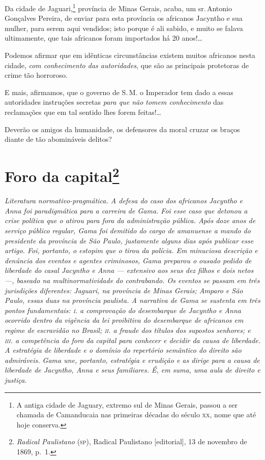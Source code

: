 Da cidade de Jaguari,\footnote{A antiga cidade de Jaguary, extremo sul
  de Minas Gerais, passou a ser chamada de Camanducaia nas primeiras\label{camanducaia}
  décadas do século \textsc{xx}, nome que até hoje conserva.} província de Minas
Gerais, acaba, um sr.\,Antonio Gonçalves Pereira, de enviar para esta
província os africanos Jacyntho e sua mulher, para serem aqui vendidos;
isto porque é ali sabido, e muito se falava ultimamente, que tais
africanos foram importados há 20 anos!\ldots{}

Podemos afirmar que em idênticas circunstâncias existem muitos africanos
nesta cidade, \emph{com conhecimento das autoridades}, que são as
principais protetoras de crime tão horroroso.

E mais, afirmamos, que o governo de S.\,M. o Imperador tem dado a essas
autoridades instruções secretas \emph{para que não tomem conhecimento}
das reclamações que em tal sentido lhes forem feitas!\ldots

Deverão os amigos da humanidade, os defensores da moral cruzar os braços
diante de tão abomináveis delitos?

\chapter{Foro da capital\footnote{\emph{Radical Paulistano} (\textsc{sp}), Radical Paulistano {[}editorial{]}, 13 de novembro de 1869, p.~1.}}

\begin{didascalia}\itshape
Literatura normativo-pragmática. A defesa do caso dos africanos Jacyntho
e Anna foi paradigmática para a carreira de Gama. Foi esse caso que
detonou a crise política que o atirou para fora da administração
pública. Após doze anos de serviço público regular, Gama foi demitido do
cargo de amanuense a mando do presidente da província de São Paulo,
justamente alguns dias após publicar esse artigo. Foi, portanto, o
estopim que o tirou da polícia. Em minuciosa descrição e denúncia dos
eventos e agentes criminosos, Gama preparou o ousado pedido de liberdade
do casal Jacyntho e Anna --- extensivo aos seus dez filhos e dois netos
---, baseado na multinormatividade do contrabando. Os eventos se passam
em três jurisdições diferentes: Jaguari, na província de Minas Gerais;
Amparo e São Paulo, essas duas na província paulista. A narrativa de
Gama se sustenta em três pontos fundamentais: \textsc{i}. a comprovação do
desembarque de Jacyntho e Anna ocorrido dentro da vigência da lei
proibitiva do desembarque de africanos em regime de escravidão no
Brasil; \textsc{ii}. a fraude dos títulos dos supostos senhores; e \textsc{iii}. a
competência do foro da capital para conhecer e decidir da causa de
liberdade. A estratégia de liberdade e o domínio do repertório semântico
do direito são admiráveis. Gama une, portanto, estratégia e erudição e
as dirige para a causa de liberdade de Jacyntho, Anna e seus familiares.
É, em suma, uma aula de direito e justiça.
\end{didascalia}



